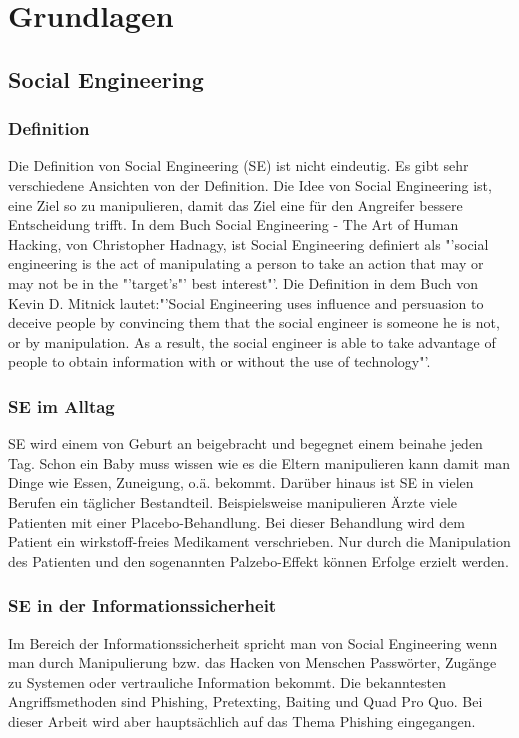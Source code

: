 
\chapter {Grundlagen}  %
\label{cha:grundlagen} %

\section{Social Engineering} %
\label {sec:Social Engineering} %
	\subsection{Definition}
	Die Definition von Social Engineering (SE) ist nicht eindeutig. Es gibt sehr verschiedene Ansichten von der Definition. Die Idee von Social Engineering ist, eine Ziel so zu manipulieren, damit das Ziel eine für den Angreifer bessere Entscheidung trifft. In dem Buch Social Engineering - The Art of Human Hacking, von Christopher Hadnagy, ist Social Engineering definiert als "'social engineering is the act of manipulating a person to take an action that may or may not be in the "'target’s"' best interest"'\cite{ArtOfHumanHacking}. Die Definition in dem Buch von Kevin D. Mitnick lautet:"'Social Engineering uses influence and persuasion to deceive people by convincing them that the social engineer is someone he is not, or by manipulation. As a result, the social engineer is able to take advantage of people to obtain information with or without the use of technology"'\cite{ArtOfDeception}.\\
	
	\subsection{SE im Alltag}
	SE wird einem von Geburt an beigebracht und begegnet einem beinahe jeden Tag. Schon ein Baby muss wissen wie es die Eltern manipulieren kann damit man Dinge wie Essen, Zuneigung, o.ä. bekommt. Darüber hinaus ist SE in vielen Berufen ein täglicher Bestandteil. Beispielsweise manipulieren Ärzte viele Patienten mit einer Placebo-Behandlung. Bei dieser Behandlung wird dem Patient ein wirkstoff-freies Medikament verschrieben. Nur durch die Manipulation des Patienten und den sogenannten Palzebo-Effekt können Erfolge erzielt werden.\\
	
	\subsection{SE in der Informationssicherheit}
	Im Bereich der Informationssicherheit spricht man von Social Engineering wenn man durch Manipulierung bzw. das Hacken von Menschen Passwörter, Zugänge zu Systemen oder vertrauliche Information bekommt. Die bekanntesten Angriffsmethoden sind Phishing, Pretexting, Baiting und Quad Pro Quo. Bei dieser Arbeit wird aber hauptsächlich auf das Thema Phishing eingegangen.

